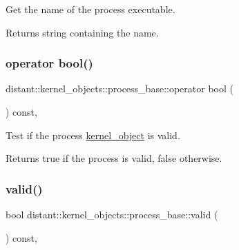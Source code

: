 Get the name of the process executable. 

\begin{DoxyReturn}{Returns}
string containing the name. 
\end{DoxyReturn}
\mbox{\label{classdistant_1_1kernel__objects_1_1process__base_a0d69c4e7d61551e7246eed5dcaabc6d9}} 
\subsubsection{\texorpdfstring{operator bool()}{operator bool()}}
{\footnotesize\ttfamily distant\+::kernel\+\_\+objects\+::process\+\_\+base\+::operator bool (\begin{DoxyParamCaption}{ }\end{DoxyParamCaption}) const\hspace{0.3cm}{\ttfamily [inline]}, {\ttfamily [noexcept]}}



Test if the process \mbox{\hyperlink{classdistant_1_1kernel__objects_1_1kernel__object}{kernel\+\_\+object}} is valid. 

\begin{DoxyReturn}{Returns}
true if the process is valid, false otherwise. 
\end{DoxyReturn}
\mbox{\label{classdistant_1_1kernel__objects_1_1process__base_a6299b49ad8fb1c22e54dc9aa6c3a09b2}} 
\subsubsection{\texorpdfstring{valid()}{valid()}}
{\footnotesize\ttfamily bool distant\+::kernel\+\_\+objects\+::process\+\_\+base\+::valid (\begin{DoxyParamCaption}{ }\end{DoxyParamCaption}) const\hspace{0.3cm}{\ttfamily [inline]}, {\ttfamily [noexcept]}}



